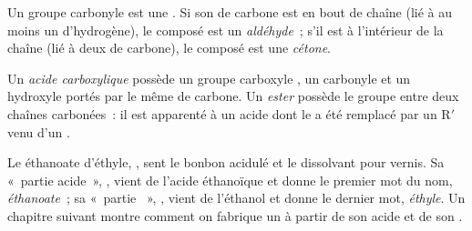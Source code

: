 \begin{definition}\label{def:g11:functional-groups:carbonyl}
Un groupe carbonyle est une  . Si son  de
carbone est en bout de chaîne (lié à au moins un  d'hydrogène), le
composé est un \emph{aldéhyde}~; s'il est à l'intérieur
de la chaîne (lié à deux  de carbone), le composé est une
\emph{cétone}.
\end{definition}

\begin{definition}\label{def:g11:functional-groups:carboxylic-acid}
Un \emph{acide carboxylique} possède un groupe
carboxyle , un carbonyle et un hydroxyle portés par le même
 de carbone. Un \emph{ester} possède le groupe
 entre deux chaînes carbonées~: il est apparenté à un acide
dont le  a été remplacé par un R$'$ venu d'un .
\end{definition}

\begin{example}\label{ex:g11:functional-groups:ethyl-ethanoate}
Le  éthanoate d'éthyle, , sent le bonbon
acidulé et le dissolvant pour vernis. Sa «~partie acide~», ,
vient de l'acide éthanoïque  et donne le premier mot du
nom, \emph{éthanoate}~; sa «~partie ~», , vient de
l'éthanol  et donne le dernier mot, \emph{éthyle}. Un
chapitre suivant montre comment on fabrique un  à partir de son
acide et de son .
\end{example}

